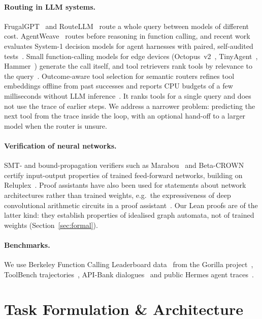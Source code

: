 \documentclass[10pt]{article}
\begin{document}
\paragraph{Routing in LLM systems.} FrugalGPT~\citep{chen2023frugalgpt} and RouteLLM~\citep{ong2024routellm} route a whole query between models of different cost. AgentWeave~\citep{singla2026agentweave} routes before reasoning in function calling, and recent work evaluates System-1 decision models for agent harnesses with paired, self-audited tests~\citep{li2026fastmodels}. Small function-calling models for edge devices (Octopus~v2~\citep{chen2024octopus}, TinyAgent~\citep{erdogan2024tinyagent}, Hammer~\citep{lin2024hammer}) generate the call itself, and tool retrievers rank tools by relevance to the query~\citep{qu2024colt}. Outcome-aware tool selection for semantic routers refines tool embeddings offline from past successes and reports CPU budgets of a few milliseconds without LLM inference~\citep{chen2026oats}. It ranks tools for a single query and does not use the trace of earlier steps. We address a narrower problem: predicting the next tool from the trace inside the loop, with an optional hand-off to a larger model when the router is unsure.
\paragraph{Verification of neural networks.} SMT- and bound-propagation verifiers such as Marabou~\citep{katz2019marabou} and Beta-CROWN~\citep{wang2021beta} certify input-output properties of trained feed-forward networks, building on Reluplex~\citep{katz2017reluplex}. Proof assistants have also been used for statements about network architectures rather than trained weights, e.g.\ the expressiveness of deep convolutional arithmetic circuits in a proof assistant~\citep{bentkamp2017expressiveness}. Our Lean proofs are of the latter kind: they establish properties of idealised graph automata, not of trained weights (Section~\ref{sec:formal}).
\paragraph{Benchmarks.} We use Berkeley Function Calling Leaderboard data~\citep{gorilla-bfcl} from the Gorilla project~\citep{patil2023gorilla}, ToolBench trajectories~\citep{qin2023toolllm}, API-Bank dialogues~\citep{li2023apibank} and public Hermes agent traces~\citep{hermestraces}.

\section{Task Formulation \& Architecture}\label{sec:formulation}
\end{document}
